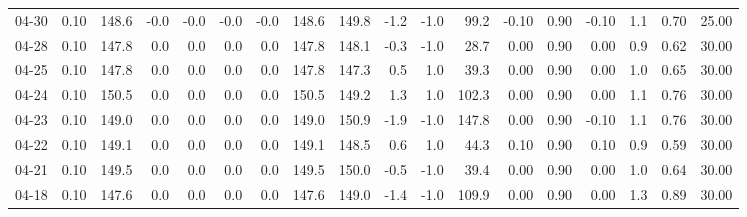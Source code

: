\begin{threeparttable}
{\begin{tabular}{lrrrrrrrrrrrrrrrrr}
  04-30 &     0.10 & 148.6 &              -0.0 &              -0.0 &               -0.0 &               -0.0 & 148.6 & 149.8 &       -1.2 &                     -1.0 &                99.2 &      -0.10 &      0.90 &          -0.10 &              1.1 &            0.70 &                  25.00 \\
  04-28 &     0.10 & 147.8 &               0.0 &               0.0 &                0.0 &                0.0 & 147.8 & 148.1 &       -0.3 &                     -1.0 &                28.7 &       0.00 &      0.90 &           0.00 &              0.9 &            0.62 &                  30.00 \\
  04-25 &     0.10 & 147.8 &               0.0 &               0.0 &                0.0 &                0.0 & 147.8 & 147.3 &        0.5 &                      1.0 &                39.3 &       0.00 &      0.90 &           0.00 &              1.0 &            0.65 &                  30.00 \\
  04-24 &     0.10 & 150.5 &               0.0 &               0.0 &                0.0 &                0.0 & 150.5 & 149.2 &        1.3 &                      1.0 &               102.3 &       0.00 &      0.90 &           0.00 &              1.1 &            0.76 &                  30.00 \\
  04-23 &     0.10 & 149.0 &               0.0 &               0.0 &                0.0 &                0.0 & 149.0 & 150.9 &       -1.9 &                     -1.0 &               147.8 &       0.00 &      0.90 &          -0.10 &              1.1 &            0.76 &                  30.00 \\
  04-22 &     0.10 & 149.1 &               0.0 &               0.0 &                0.0 &                0.0 & 149.1 & 148.5 &        0.6 &                      1.0 &                44.3 &       0.10 &      0.90 &           0.10 &              0.9 &            0.59 &                  30.00 \\
  04-21 &     0.10 & 149.5 &               0.0 &               0.0 &                0.0 &                0.0 & 149.5 & 150.0 &       -0.5 &                     -1.0 &                39.4 &       0.00 &      0.90 &           0.00 &              1.0 &            0.64 &                  30.00 \\
  04-18 &     0.10 & 147.6 &               0.0 &               0.0 &                0.0 &                0.0 & 147.6 & 149.0 &       -1.4 &                     -1.0 &               109.9 &       0.00 &      0.90 &           0.00 &              1.3 &            0.89 &                  30.00 \\

\end{tabular}}
\end{threeparttable}
